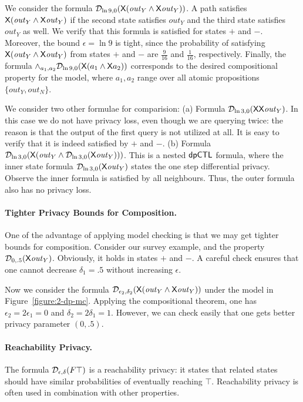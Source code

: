 We consider the formula $\mathcal{D}_{{\ln 9}, {0}} (\mathsf{X} (\mathit{out}_Y\wedge \mathsf{X} \mathit{out}_Y))$. A path satisfies $\mathsf{X} (\mathit{out}_Y\wedge \mathsf{X} \mathit{out}_Y)$ if the second state satisfies $\mathit{out}_Y$ and the third state satisfies $\mathit{out}_Y$ as well. We verify that this formula is satisfied for states $+$ and $-$. Moreover, the bound $\epsilon=\ln 9$ is tight, since the probability of satisfying $\mathsf{X} (\mathit{out}_Y\wedge \mathsf{X} \mathit{out}_Y)$ from states $+$ and $-$ are $\frac{9}{16}$ and $\frac{1}{16}$, respectively. Finally, the formula $\wedge_{a_1,a_2}\mathcal{D}_{{\ln 9}, {0}} (\mathsf{X} (a_1\wedge \mathsf{X} a_2))$ corresponds to the desired compositional property for the model, where $a_1,a_2$ range over all atomic propositions $\{\mathit{out}_Y, \mathit{out}_N\}$.

We consider two other formulae for comparision:
(a) Formula $\mathcal{D}_{{\ln 3}, {0}} (\mathsf{X} \mathsf{X} \mathit{out}_Y)$. In this case we do not have privacy loss, even though we are querying twice: the reason is that the output of the first query is not utilized at all. It is easy to verify that it is indeed satisfied by $+$ and $-$.
(b) Formula $\mathcal{D}_{{\ln 3}, {0}} (\mathsf{X} (\mathit{out}_Y\wedge \mathcal{D}_{{\ln 3}, {0}}(\mathsf{X} \mathit{out}_Y)))$. This is a nested $\textsf{dpCTL}$ formula, where the inner state formula $\mathcal{D}_{{\ln 3}, {0}}(\mathsf{X} \mathit{out}_Y)$ states the one step differential privacy. Observe the inner formula is satisfied by all neighbours. Thus, the outer formula also has no privacy loss.

\paragraph{Tighter Privacy Bounds for Composition.}
One of the advantage of applying model checking is that we may get tighter bounds for composition. Consider our survey example, and the property $\mathcal{D}_{{0}, {.5}} (\mathsf{X} \mathit{out}_Y)$. Obviously, it holds in states $+$ and $-$. A careful check ensures that one cannot decrease  $\delta_1=.5$ without increasing $\epsilon$.

Now we consider the formula $\mathcal{D}_{{\epsilon_2}, {\delta_2}} (\mathsf{X}
(\mathit{out}_Y\wedge \mathsf{X} \mathit{out}_Y))$ under the model in
Figure~\ref{figure:2-dp-mc}. Applying the
compositional theorem, one has $\epsilon_2=2\epsilon_1=0$ and
$\delta_2=2\delta_1=1$. However, we can check easily that one gets
better privacy parameter $(0,.5)$.


\paragraph{Reachability Privacy.}
The formula $\mathcal{D}_{{\epsilon}, {\delta}}(F \top)$ is a reachability privacy: it states that related states should have similar probabilities of eventually reaching $\top$. Reachability privacy is often used in combination with other properties.

